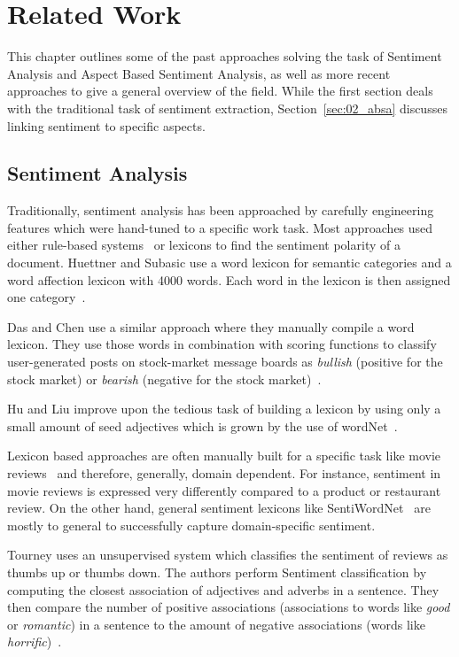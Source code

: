 \chapter{Related Work}
\label{ch:relWork}

This chapter outlines some of the past approaches solving the task of Sentiment Analysis and Aspect Based Sentiment Analysis, as well as more recent approaches to give a general overview of the field. While the first section deals with the traditional task of sentiment extraction, Section~\ref{sec:02_absa} discusses linking sentiment to specific aspects.

\section{Sentiment Analysis}

Traditionally, sentiment analysis has been approached by carefully engineering features which were hand-tuned to a specific work task. Most approaches used either rule-based systems~\cite{Popescu2005} or lexicons to find the sentiment polarity of a document. Huettner and Subasic use a word lexicon for semantic categories and a word affection lexicon with 4000 words. Each word in the lexicon is then assigned one category~\cite{Huettner2000}. 

Das and Chen use a similar approach where they manually compile a word lexicon. They use those words in combination with scoring functions to classify user-generated posts on stock-market message boards as \textit{bullish} {(positive for the stock market)} or \textit{bearish} {(negative for the stock market)}~\cite{Das2007}.

Hu and Liu improve upon the tedious task of building a lexicon by using only a small amount of seed adjectives which is grown by the use of wordNet~\cite{Hu2004}.
\medskip

Lexicon based approaches are often manually built for a specific task like movie reviews~\cite{Tong2001, Thet2010} and therefore, generally, domain dependent. For instance, sentiment in movie reviews is expressed very differently compared to a product or restaurant review. On the other hand, general sentiment lexicons like SentiWordNet~\cite{Baccianella2010} are mostly to general to successfully capture domain-specific sentiment.
\medskip

Tourney uses an unsupervised system which classifies the sentiment of reviews as thumbs up or thumbs down. The authors perform Sentiment classification by computing the closest association of adjectives and adverbs in a sentence. They then compare the number of positive associations {(associations to words like \textit{good} or \textit{romantic})} in a sentence to the amount of negative associations {(words like \textit{horrific})}~\cite{Turney2007}.
\medskip

